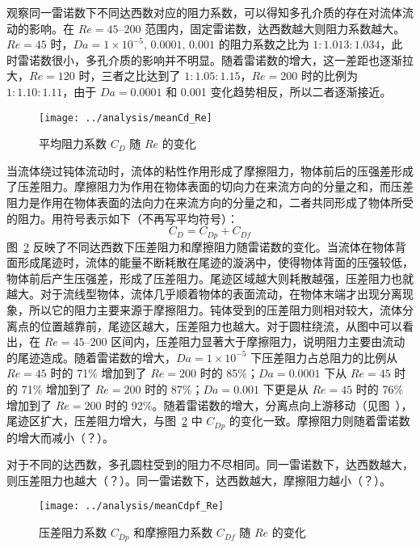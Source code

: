 观察同一雷诺数下不同达西数对应的阻力系数，可以得知多孔介质的存在对流体流动的影响。在 $Re=45$--$200$ 范围内，固定雷诺数，达西数越大则阻力系数越大。$Re=45$ 时，$Da=1\times 10^{-5},\,0.0001,\,0.001$ 的阻力系数之比为 $1:1.013:1.034$，此时雷诺数很小，多孔介质的影响并不明显。随着雷诺数的增大，这一差距也逐渐拉大，$Re=120$ 时，三者之比达到了 $1:1.05:1.15$，$Re=200$ 时的比例为 $1:1.10:1.11$，由于 $Da=0.0001$ 和 0.001 变化趋势相反，所以二者逐渐接近。

\begin{figure}
	\centering
	\texttt{[image: ../analysis/meanCd\_Re]}
	\caption{平均阻力系数 $C_D$ 随 $Re$ 的变化}
	\label{fig: meanCd}
\end{figure}

当流体绕过钝体流动时，流体的粘性作用形成了摩擦阻力，物体前后的压强差形成了压差阻力。摩擦阻力为作用在物体表面的切向力在来流方向的分量之和，而压差阻力是作用在物体表面的法向力在来流方向的分量之和，二者共同形成了物体所受的阻力。用符号表示如下（不再写平均符号）：
\begin{equation}
	C_D = C_{Dp} + C_{Df}
\end{equation}
图~\ref{fig: meanCdpf} 反映了不同达西数下压差阻力和摩擦阻力随雷诺数的变化。当流体在物体背面形成尾迹时，流体的能量不断耗散在尾迹的漩涡中，使得物体背面的压强较低，物体前后产生压强差，形成了压差阻力。尾迹区域越大则耗散越强，压差阻力也就越大。对于流线型物体，流体几乎顺着物体的表面流动，在物体末端才出现分离现象，所以它的阻力主要来源于摩擦阻力。钝体受到的压差阻力则相对较大，流体分离点的位置越靠前，尾迹区越大，压差阻力也越大。对于圆柱绕流，从图中可以看出，在 $Re=45$--$200$ 区间内，压差阻力显著大于摩擦阻力，说明阻力主要由流动的尾迹造成。随着雷诺数的增大，$Da=1\times 10^{-5}$ 下压差阻力占总阻力的比例从 $Re=45$ 时的 71\% 增加到了 $Re=200$ 时的 85\%；$Da=0.0001$ 下从 $Re=45$ 时的 71\% 增加到了 $Re=200$ 时的 87\%；$Da=0.001$ 下更是从 $Re=45$ 时的 76\% 增加到了 $Re=200$ 时的 92\%。随着雷诺数的增大，分离点向上游移动（见图~），尾迹区扩大，压差阻力增大，与图~\ref{fig: meanCdpf} 中 $C_{Dp}$ 的变化一致。摩擦阻力则随着雷诺数的增大而减小（？）。

对于不同的达西数，多孔圆柱受到的阻力不尽相同。同一雷诺数下，达西数越大，则压差阻力也越大（？）。同一雷诺数下，达西数越大，摩擦阻力越小（？）。

\begin{figure}
	\centering
	\texttt{[image: ../analysis/meanCdpf\_Re]}
	\caption{压差阻力系数 $C_{Dp}$ 和摩擦阻力系数 $C_{Df}$ 随 $Re$ 的变化}
	\label{fig: meanCdpf}
\end{figure}

